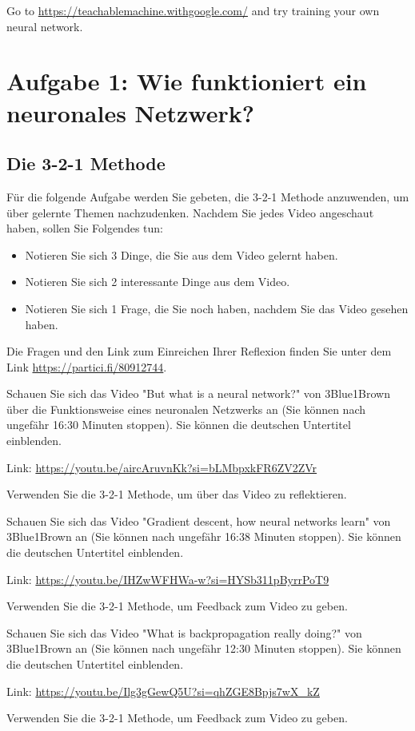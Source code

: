 \documentclass[12pt,a4paper]{report}
\begin{document}
\begin{ex}
     Go to \url{https://teachablemachine.withgoogle.com/} and try training your own neural network.
\end{ex}


\newpage
\section*{Aufgabe 1: Wie funktioniert ein neuronales Netzwerk?}

\subsection*{Die 3-2-1 Methode}
Für die folgende Aufgabe werden Sie gebeten, die 3-2-1 Methode anzuwenden, um über gelernte Themen nachzudenken. Nachdem Sie jedes Video angeschaut haben, sollen Sie Folgendes tun:
\begin{itemize}
    \item Notieren Sie sich 3 Dinge, die Sie aus dem Video gelernt haben.
    \item Notieren Sie sich 2 interessante Dinge aus dem Video.
    \item Notieren Sie sich 1 Frage, die Sie noch haben, nachdem Sie das Video gesehen haben.
\end{itemize}

Die Fragen und den Link zum Einreichen Ihrer Reflexion finden Sie unter dem Link \url{https://partici.fi/80912744}.


\begin{ex}
     Schauen Sie sich das Video "But what is a neural network?" von 3Blue1Brown über die Funktionsweise eines neuronalen Netzwerks an (Sie können nach ungefähr 16:30 Minuten stoppen). Sie können die deutschen Untertitel einblenden.
     
     Link: \url{https://youtu.be/aircAruvnKk?si=bLMbpxkFR6ZV2ZVr}

     Verwenden Sie die 3-2-1 Methode, um über das Video zu reflektieren. 

\end{ex}
\begin{ex}
     Schauen Sie sich das Video "Gradient descent, how neural networks learn" von 3Blue1Brown an (Sie können nach ungefähr 16:38 Minuten stoppen). Sie können die deutschen Untertitel einblenden.
     
     Link: \url{https://youtu.be/IHZwWFHWa-w?si=HYSb311pByrrPoT9}

     Verwenden Sie die 3-2-1 Methode, um Feedback zum Video zu geben.

\end{ex}
\begin{ex}
     Schauen Sie sich das Video "What is backpropagation really doing?" von 3Blue1Brown an (Sie können nach ungefähr 12:30 Minuten stoppen). Sie können die deutschen Untertitel einblenden.
     
     Link: \url{https://youtu.be/Ilg3gGewQ5U?si=qhZGE8Bpjs7wX_kZ}

     Verwenden Sie die 3-2-1 Methode, um Feedback zum Video zu geben.

\end{ex}
\end{document}
